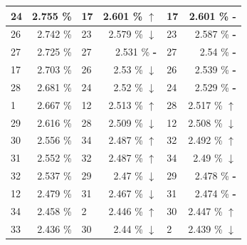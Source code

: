 \documentclass[letterpaper]{article}
\newcommand{\caseUp}[1][]{#1\textcolor[HTML]{008000}{$\mathbf{\uparrow}$}}
\newcommand{\caseStable}[1][]{#1\textcolor[HTML]{3779dd}{\textbf{-}}}
\newcommand{\caseDown}[1][]{#1\textcolor[HTML]{dd3737}{$\mathbf{\downarrow}$}}
\begin{document}
\begin{table}
\begin{tabular}{|l|r||l|r||l|r|}
	    \cellcolor[HTML]{FF4500} 24 & 2.755 \% & \cellcolor[HTML]{FF8C00} 17 & 2.601 \% \caseUp[\hfill] & \cellcolor[HTML]{FF8C00} 17 & 2.601 \% \caseStable[\hfill] \\ \hline 
	    \cellcolor[HTML]{E6E6FA} 26 & 2.742 \% & \cellcolor[HTML]{FFC1C1} 23 & 2.579 \% \caseDown[\hfill] & \cellcolor[HTML]{FFC1C1} 23 & 2.587 \% \caseStable[\hfill] \\ \hline 
	    \cellcolor[HTML]{FFD700} 27 & 2.725 \% & \cellcolor[HTML]{FFD700} 27 & 2.531 \% \caseStable[\hfill] & \cellcolor[HTML]{FFD700} 27 & 2.54 \% \caseStable[\hfill] \\ \hline 
	    \cellcolor[HTML]{FF8C00} 17 & 2.703 \% & \cellcolor[HTML]{E6E6FA} 26 & 2.53 \%  \caseDown[\hfill] & \cellcolor[HTML]{E6E6FA} 26 & 2.539 \% \caseStable[\hfill] \\ \hline 
	    \cellcolor[HTML]{FFD700} 28 & 2.681 \% & \cellcolor[HTML]{FF4500} 24 & 2.52 \%  \caseDown[\hfill] & \cellcolor[HTML]{FF4500} 24 & 2.529 \% \caseStable[\hfill] \\ \hline 
	    \cellcolor[HTML]{FFFFFF}  1 & 2.667 \% & \cellcolor[HTML]{FF69B4} 12 & 2.513 \% \caseUp[\hfill] & \cellcolor[HTML]{FFD700} 28 & 2.517 \% \caseUp[\hfill] \\ \hline 
	    \cellcolor[HTML]{FFFFF0} 29 & 2.616 \% & \cellcolor[HTML]{FFD700} 28 & 2.509 \% \caseDown[\hfill] & \cellcolor[HTML]{FF69B4} 12 & 2.508 \% \caseDown[\hfill] \\ \hline 
	    \cellcolor[HTML]{FFD700} 30 & 2.556 \% & \cellcolor[HTML]{EEEED1} 34 & 2.487 \% \caseUp[\hfill] & \cellcolor[HTML]{2E8B57} 32 & 2.492 \% \caseUp[\hfill] \\ \hline 
	    \cellcolor[HTML]{BEBEBE} 31 & 2.552 \% & \cellcolor[HTML]{2E8B57} 32 & 2.487 \% \caseUp[\hfill] & \cellcolor[HTML]{EEEED1} 34 & 2.49 \% \caseDown[\hfill] \\ \hline 
	    \cellcolor[HTML]{2E8B57} 32 & 2.537 \% & \cellcolor[HTML]{FFFFF0} 29 & 2.47 \%  \caseDown[\hfill] & \cellcolor[HTML]{FFFFF0} 29 & 2.478 \% \caseStable[\hfill] \\ \hline 
	    \cellcolor[HTML]{FF69B4} 12 & 2.479 \% & \cellcolor[HTML]{BEBEBE} 31 & 2.467 \% \caseDown[\hfill] & \cellcolor[HTML]{BEBEBE} 31 & 2.474 \% \caseStable[\hfill] \\ \hline 
	    \cellcolor[HTML]{EEEED1} 34 & 2.458 \% & \cellcolor[HTML]{A0522D}  2 & 2.446 \% \caseUp[\hfill] & \cellcolor[HTML]{FFD700} 30 & 2.447 \% \caseUp[\hfill] \\ \hline 
	    \cellcolor[HTML]{2E8B57} 33 & 2.436 \% & \cellcolor[HTML]{FFD700} 30 & 2.44 \%  \caseDown[\hfill] & \cellcolor[HTML]{A0522D} 2 & 2.439 \% \caseDown[\hfill] \\ \hline 

\end{tabular}
\end{table}
\end{document}
